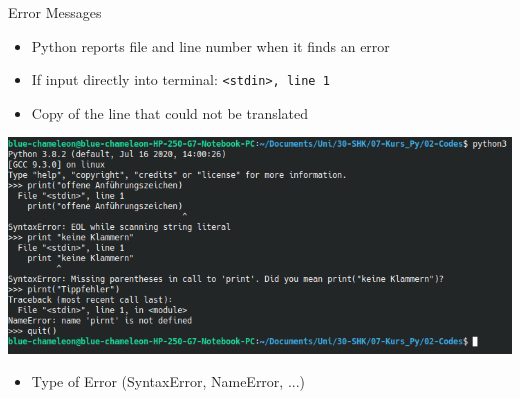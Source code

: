 \begin{frame}{Error Messages}
%
\begin{minipage}[t]{.29\linewidth}
\begin{itemize}
\item Python reports file and line number when it finds an error
\item If input directly into terminal: \texttt{<stdin>, line 1}
\item Copy of the line that could not be translated
\end{itemize}
\end{minipage}
%
%
\begin{minipage}[t]{.69\linewidth}
\vspace{0pt}
\includegraphics[width=\linewidth]{./gfx/errMsgs}
\end{minipage}
%
%
\begin{itemize}
\item Type of Error (SyntaxError, NameError, ...)
\end{itemize}
%
\end{frame}


